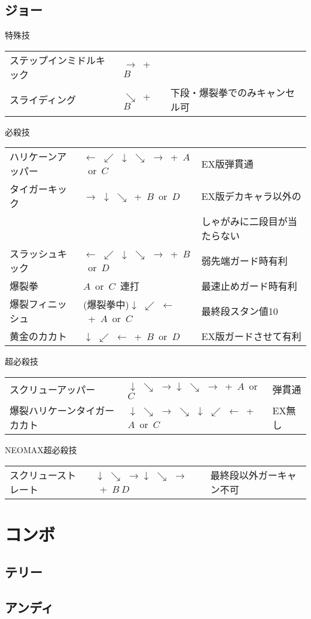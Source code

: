 \documentclass[a4j,11pt]{jarticle}
\def\hado{$\downarrow$ $\searrow$ $\rightarrow$}%
\def\tatsu{$\downarrow$ $\swarrow$ $\leftarrow$}%
\def\syoryu{$\rightarrow$ $\downarrow$ $\searrow$}%
\def\yoga{$\leftarrow$ $\swarrow$ $\downarrow$ $\searrow$ $\rightarrow$}%
\def\ryuko{$\downarrow$ $\searrow$ $\rightarrow$ $\searrow$ $\downarrow$ $\swarrow$ $\leftarrow$}%
\begin{document}
\subsection{ジョー}
\begin{itembox}[l]{特殊技}
\begin{tabular}{lll}
ステップインミドルキック&$\rightarrow$\ +\ $B$&\\
スライディング&$\searrow$\ +\ $B$&下段・爆裂拳でのみキャンセル可
\end{tabular}
\end{itembox}
\begin{itembox}[l]{必殺技}
\begin{tabular}{lll}
ハリケーンアッパー&\yoga\ +\ $A$\ or\ $C$&EX版弾貫通 \times 3\\
タイガーキック&\syoryu\ +\ $B$\ or\ $D$&EX版デカキャラ以外の\\
&&しゃがみに二段目が当たらない\\
スラッシュキック&\yoga\ +\ $B$\ or\ $D$&弱先端ガード時有利\\
爆裂拳&$A$\ or\ $C$\ 連打&最速止めガード時有利\\
爆裂フィニッシュ&(爆裂拳中)\tatsu\ +\ $A$\ or\ $C$&最終段スタン値10\\
黄金のカカト&\tatsu\ +\ $B$\ or\ $D$&EX版ガードさせて有利
\end{tabular}
\end{itembox}
\begin{itembox}[l]{超必殺技}
\begin{tabular}{lll}
スクリューアッパー&\hado\hado\ +\ $A$\ or\ $C$&弾貫通\\
爆裂ハリケーンタイガーカカト&\ryuko\ +\ $A$\ or\ $C$&EX無し
\end{tabular}
\end{itembox}
\begin{itembox}[l]{NEOMAX超必殺技}
\begin{tabular}{lll}
スクリューストレート&\hado\hado\ +\ $B\ D$&最終段以外ガーキャン不可
\end{tabular}
\end{itembox}
\newpage
\section{コンボ}
\subsection{テリー}
\newpage
\subsection{アンディ}
\newpage
\end{document}
